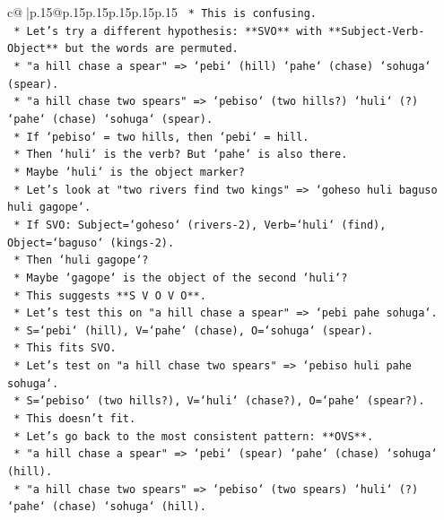 \documentclass{article}
\begin{document}
{\begin{supertabular}{c@{$\;$}|p{.15\linewidth}@{}p{.15\linewidth}p{.15\linewidth}p{.15\linewidth}p{.15\linewidth}p{.15\linewidth}}
{{{\texttt{                    *   This is confusing.} \\
\texttt{        *   Let's try a different hypothesis: **SVO** with **Subject{-}Verb{-}Object** but the words are permuted.} \\
\texttt{            *   "a hill chase a spear" => `pebi` (hill) `pahe` (chase) `sohuga` (spear).} \\
\texttt{            *   "a hill chase two spears" => `pebiso` (two hills?) `huli` (?) `pahe` (chase) `sohuga` (spear).} \\
\texttt{            *   If `pebiso` = two hills, then `pebi` = hill.} \\
\texttt{            *   Then `huli` is the verb? But `pahe` is also there.} \\
\texttt{            *   Maybe `huli` is the object marker?} \\
\texttt{            *   Let's look at "two rivers find two kings" => `goheso huli baguso huli gagope`.} \\
\texttt{                *   If SVO: Subject=`goheso` (rivers{-}2), Verb=`huli` (find), Object=`baguso` (kings{-}2).} \\
\texttt{                *   Then `huli gagope`?} \\
\texttt{                *   Maybe `gagope` is the object of the second `huli`?} \\
\texttt{                *   This suggests **S V O V O**.} \\
\texttt{            *   Let's test this on "a hill chase a spear" => `pebi pahe sohuga`.} \\
\texttt{                *   S=`pebi` (hill), V=`pahe` (chase), O=`sohuga` (spear).} \\
\texttt{                *   This fits SVO.} \\
\texttt{            *   Let's test on "a hill chase two spears" => `pebiso huli pahe sohuga`.} \\
\texttt{                *   S=`pebiso` (two hills?), V=`huli` (chase?), O=`pahe` (spear?).} \\
\texttt{                *   This doesn't fit.} \\
\texttt{        *   Let's go back to the most consistent pattern: **OVS**.} \\
\texttt{            *   "a hill chase a spear" => `pebi` (spear) `pahe` (chase) `sohuga` (hill).} \\
\texttt{            *   "a hill chase two spears" => `pebiso` (two spears) `huli` (?) `pahe` (chase) `sohuga` (hill).} \\
}}}
\end{supertabular}}
\end{document}
